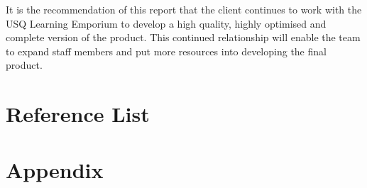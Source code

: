 \documentclass[11pt]{article}
\begin{document}
It is the recommendation of this report that the client continues to work with the USQ Learning Emporium to develop a high quality, highly optimised and complete version of the product. This continued relationship will enable the team to expand staff members and put more resources into developing the final product.


\newpage


\section{Reference List}


\newpage


\section{Appendix}
\end{document}
